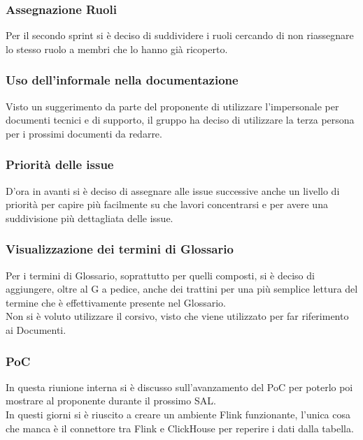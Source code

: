 \documentclass[10pt]{article}
\begin{document}
\subsubsection{Assegnazione Ruoli}
Per il secondo sprint si è deciso di suddividere i ruoli cercando di non riassegnare lo stesso ruolo a membri che lo hanno già ricoperto.

\subsubsection{Uso dell'informale nella documentazione}
Visto un suggerimento da parte del proponente di utilizzare l'impersonale per documenti tecnici e di supporto, il gruppo ha deciso di utilizzare la terza persona per i prossimi documenti da redarre.

\subsubsection{Priorità delle issue}
D'ora in avanti si è deciso di assegnare alle issue successive anche un livello di priorità per capire più facilmente su che lavori concentrarsi e per avere una suddivisione più dettagliata delle issue.

\subsubsection{Visualizzazione dei termini di Glossario}
Per i termini di Glossario, soprattutto per quelli composti, si è deciso di aggiungere, oltre al G a pedice, anche dei trattini per una più semplice lettura del termine che è effettivamente presente nel Glossario.\\
Non si è voluto utilizzare il corsivo, visto che viene utilizzato per far riferimento ai Documenti.

\subsubsection{PoC}
In questa riunione interna si è discusso sull'avanzamento del PoC per poterlo poi mostrare al proponente durante il prossimo SAL.\\
In questi giorni si è riuscito a creare un ambiente Flink funzionante, l'unica cosa che manca è il connettore tra Flink e ClickHouse per reperire i dati dalla tabella.
\end{document}

